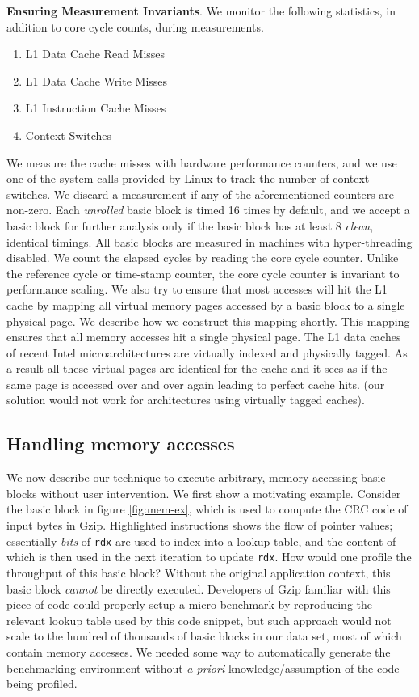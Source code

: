 \textbf{Ensuring Measurement Invariants}.
We monitor the following statistics, in addition to core cycle counts,
during measurements.
\begin{enumerate}
    \item L1 Data Cache Read Misses
    \item L1 Data Cache Write Misses
    \item L1 Instruction Cache Misses
    \item Context Switches
\end{enumerate}
We measure the cache misses with hardware performance counters, 
and we use one of the system calls provided by Linux to track the number of context switches. 
We discard a measurement
if any of the aforementioned counters are non-zero.
Each \textit{unrolled} basic block is timed 16 times by default,
and we accept a basic block for further analysis only if the basic block has at least 
8 \textit{clean}, identical timings.
All basic blocks are measured in machines with hyper-threading disabled.
We count the elapsed cycles by reading the core cycle counter.
Unlike the reference cycle or time-stamp counter, the core cycle counter is invariant
to performance scaling.
We also try to ensure that most accesses will hit the L1 cache by mapping all virtual memory pages 
accessed by a basic block to a single physical page. We describe how we construct this mapping shortly.
This mapping ensures that all memory accesses hit a single physical page.
The L1 data caches of recent Intel microarchitectures are virtually indexed and physically tagged. 
As a result all these virtual pages are identical for the cache and it sees as if the same page is accessed over and over again leading to perfect cache hits. 
(our solution would not work for architectures using virtually tagged caches).

\subsection{Handling memory accesses}\label{sec:mapping}
We now describe our technique to execute arbitrary, memory-accessing basic blocks
without user intervention.
We first show a motivating example.
Consider the basic block in figure \ref{fig:mem-ex},
which is used to compute the CRC code of input bytes in Gzip.
Highlighted instructions shows the flow of pointer values;
essentially \textit{bits} of \verb|rdx| are used to index into a lookup table, 
and the content of which is then used in the next iteration to 
update \verb|rdx|.
How would one profile the throughput of this basic block?
Without the original application context,
this basic block \textit{cannot} be directly executed.
Developers of Gzip familiar with this piece of code could 
properly setup a micro-benchmark by reproducing the
relevant lookup table used by this code snippet,
but such approach would not scale to the hundred of 
thousands of basic blocks in our data set, most of which contain memory accesses.
We needed some way to automatically generate the benchmarking environment
without \textit{a priori} knowledge/assumption of the code being profiled.

